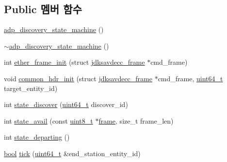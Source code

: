 \subsection*{Public 멤버 함수}
\begin{DoxyCompactItemize}
\item 
\hyperlink{classavdecc__lib_1_1adp__discovery__state__machine_a0c1823737c60fdefa3053eac3c2999df}{adp\+\_\+discovery\+\_\+state\+\_\+machine} ()
\item 
\hyperlink{classavdecc__lib_1_1adp__discovery__state__machine_a4374a22b6156e17ed915ed254e5011bf}{$\sim$adp\+\_\+discovery\+\_\+state\+\_\+machine} ()
\item 
int \hyperlink{classavdecc__lib_1_1adp__discovery__state__machine_a0a43868a3e99a6cef740e4562d006345}{ether\+\_\+frame\+\_\+init} (struct \hyperlink{structjdksavdecc__frame}{jdksavdecc\+\_\+frame} $\ast$cmd\+\_\+frame)
\item 
void \hyperlink{classavdecc__lib_1_1adp__discovery__state__machine_a603d5c117d4eb54e5b212ab96973089a}{common\+\_\+hdr\+\_\+init} (struct \hyperlink{structjdksavdecc__frame}{jdksavdecc\+\_\+frame} $\ast$cmd\+\_\+frame, \hyperlink{parse_8c_aec6fcb673ff035718c238c8c9d544c47}{uint64\+\_\+t} target\+\_\+entity\+\_\+id)
\item 
int \hyperlink{classavdecc__lib_1_1adp__discovery__state__machine_aacf39a8cb2b222d467c0b66f5f740166}{state\+\_\+discover} (\hyperlink{parse_8c_aec6fcb673ff035718c238c8c9d544c47}{uint64\+\_\+t} discover\+\_\+id)
\item 
int \hyperlink{classavdecc__lib_1_1adp__discovery__state__machine_aae62b5ebcd540a385966c89b65cc2ac7}{state\+\_\+avail} (const \hyperlink{stdint_8h_aba7bc1797add20fe3efdf37ced1182c5}{uint8\+\_\+t} $\ast$\hyperlink{gst__avb__playbin_8c_ac8e710e0b5e994c0545d75d69868c6f0}{frame}, size\+\_\+t frame\+\_\+len)
\item 
int \hyperlink{classavdecc__lib_1_1adp__discovery__state__machine_af62ada332ddbfdeb33091d66b62589cc}{state\+\_\+departing} ()
\item 
\hyperlink{avb__gptp_8h_af6a258d8f3ee5206d682d799316314b1}{bool} \hyperlink{classavdecc__lib_1_1adp__discovery__state__machine_a063a844446a392e15240a9cf4a771818}{tick} (\hyperlink{parse_8c_aec6fcb673ff035718c238c8c9d544c47}{uint64\+\_\+t} \&end\+\_\+station\+\_\+entity\+\_\+id)
\end{DoxyCompactItemize}
